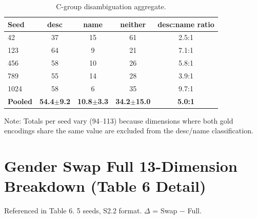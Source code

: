 \documentclass{article}
\begin{document}
\begin{table}[htbp]
\centering
\small
\caption{C-group disambiguation aggregate.}
\label{tab:cgroup_aggregate}
\begin{tabular}{lcccc}
\toprule
Seed & desc & name & neither & desc:name ratio \\
\midrule
42 & 37 & 15 & 61 & 2.5:1 \\
123 & 64 & 9 & 21 & 7.1:1 \\
456 & 58 & 10 & 26 & 5.8:1 \\
789 & 55 & 14 & 28 & 3.9:1 \\
1024 & 58 & 6 & 35 & 9.7:1 \\
\midrule
\textbf{Pooled} & \textbf{54.4$\pm$9.2} & \textbf{10.8$\pm$3.3} & \textbf{34.2$\pm$15.0} & \textbf{5.0:1} \\
\bottomrule
\end{tabular}
\end{table}

Note: Totals per seed vary (94--113) because dimensions where both gold encodings share the same value are excluded from the desc/name classification.

\section{Gender Swap Full 13-Dimension Breakdown (Table 6 Detail)}

Referenced in Table 6. 5 seeds, S2.2 format. $\Delta$ = Swap $-$ Full.
\end{document}

